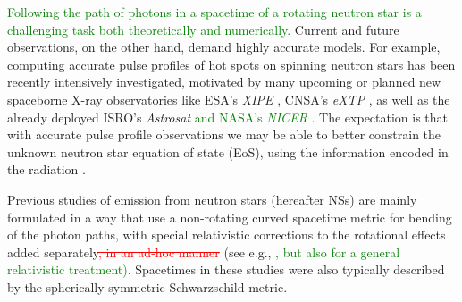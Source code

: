 \documentclass{aa}
\newcommand{\refe}[1]{\textcolor{green}{{#1}}}
\newcommand{\refedel}[1]{\textcolor{red}{\sout{#1}}}
\newcommand{\sch}{Schwarzschild }
\begin{document}
\refe{Following the path of photons in a spacetime of a rotating neutron star is a challenging task both theoretically and numerically.}
Current and future observations, on the other hand, demand highly accurate models.
For example, computing accurate pulse profiles of hot spots on spinning neutron stars has been recently intensively investigated, motivated by many upcoming or planned new spaceborne X-ray observatories like ESA's \textit{XIPE} \citep{XIPE}, CNSA's \textit{eXTP} \citep{eXTP}, as well as the already deployed ISRO's \textit{Astrosat} \citep{Astrosat} \refe{and NASA's \textit{NICER} \citep{NICER}.}
The expectation is that with accurate pulse profile observations we may be able to better constrain the unknown neutron star equation of state (EoS), using the information encoded in the radiation \citep[see e.g.,][]{LMB13}.

Previous studies of emission from neutron stars (hereafter NSs) are mainly formulated in a way that use a non-rotating curved spacetime metric for bending of the photon paths, with special relativistic corrections to the rotational effects added separately\refedel{, in an ad-hoc manner} (see e.g.,\refe{ \citealt{PFC83,P95, ML98, WM01, PG03, PB06, Lamb09a, Lamb09b, LMB13, ML15}, but also \citealt{BR01} for a general relativistic treatment). } 
Spacetimes in these studies were also typically described by the spherically symmetric \sch metric.
\end{document}
